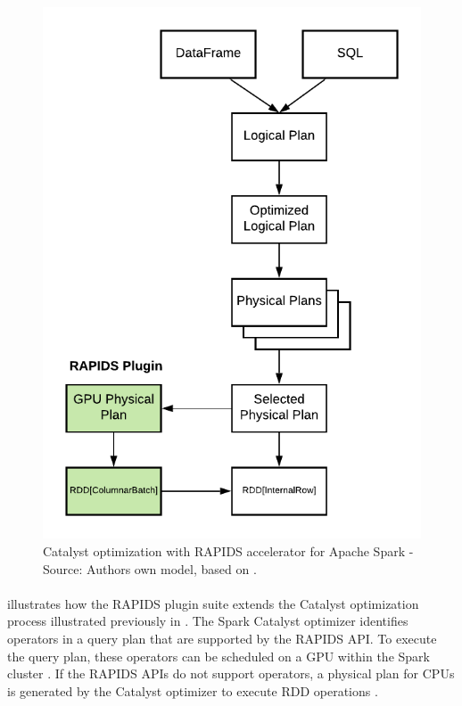 \begin{figure}[h]
\centering
\includegraphics[scale=1]{images/04_technical_background/rapids/rapids_catalyst_optimization_process}
\caption{Catalyst optimization with RAPIDS accelerator for Apache Spark - Source: Authors own model, based on \cite{Mcdonald2020SparkRapids}.}
\label{fig:04_rapids_ext_query-plan}
\end{figure}
\paragraph{} illustrates how the RAPIDS plugin suite extends the Catalyst optimization process illustrated previously in .
The Spark Catalyst optimizer identifies operators in a query plan that are supported by the RAPIDS API. To execute the query plan, these operators can be scheduled on a GPU within the Spark cluster \cite{Mcdonald2020SparkRapids}. If the RAPIDS APIs do not support operators, a physical plan for CPUs is generated by the Catalyst optimizer to execute RDD operations \cite{Mcdonald2020SparkRapids}.


